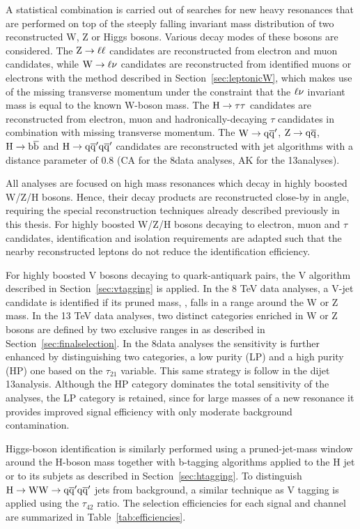 A statistical combination is carried out of searches for new heavy resonances that are performed on top of the steeply falling invariant mass distribution of two reconstructed W, Z or Higgs bosons. Various decay modes of these bosons are considered.
The $\mathrm{Z}\to\ell\ell$ candidates are reconstructed from electron and muon candidates, while $\mathrm{W}\to\ell\nu$ candidates are reconstructed from identified muons or electrons with the method described in Section~\ref{sec:leptonicW}, which makes use of the missing transverse momentum under the constraint that the $\ell\nu$ invariant mass is equal to the known W-boson mass.
The $\mathrm{H}\to\tau\tau$ candidates are reconstructed from electron, muon and hadronically-decaying $\tau$ candidates in combination with missing transverse momentum.
The $\mathrm{W}\to\mathrm{q}\overline{\mathrm{q}}'$, $\mathrm{Z}\to\mathrm{q}\overline{\mathrm{q}}$, $\mathrm{H}\to{\mathrm{b}\overline{\mathrm{b}}}$ and $\mathrm{H}\to\mathrm{q}\overline{\mathrm{q}}'\mathrm{q}\overline{\mathrm{q}}'$ candidates are reconstructed with jet algorithms with a distance parameter of 0.8 (CA for the 8\TeV data analyses, AK for the 13\TeV analyses). 

All analyses are focused on high mass resonances which decay in highly boosted W/Z/H bosons. Hence, their decay products are reconstructed close-by in angle, requiring the special reconstruction techniques already described previously in this thesis. For highly boosted W/Z/H bosons decaying to electron, muon and $\tau$ candidates, identification and isolation requirements are adapted such that the nearby reconstructed leptons do not reduce the identification efficiency.

For highly boosted V bosons decaying to quark-antiquark pairs, the V algorithm described in Section~\ref{sec:vtagging} is applied.
In the 8 TeV data analyses, a V-jet candidate is identified if its pruned mass, \mJ, falls in a range around the W or Z mass.
In the 13 TeV data analyses, two distinct categories enriched in W or Z bosons are defined by two exclusive ranges in \mJ as described in Section~\ref{sec:finalselection}.
In the 8\TeV data analyses the sensitivity is further enhanced by distinguishing two categories, a low purity (LP) and a high purity (HP) one based on the $\tau_{21}$ variable.
This same strategy is follow in the dijet 13\TeV analysis. Although the HP category dominates the total sensitivity of the analyses, the LP category is retained,
since for large masses of a new resonance it provides improved signal efficiency with only moderate background contamination.

Higgs-boson identification is similarly performed using a pruned-jet-mass window around the H-boson mass together with b-tagging algorithms applied to the H jet or to its subjets as described in Section~\ref{sec:htagging}.
To distinguish $\mathrm{H}\to\mathrm{W}\mathrm{W}\to\mathrm{q}\overline{\mathrm{q}}'\mathrm{q}\overline{\mathrm{q}}'$ jets from background, a similar technique as V tagging is applied using the $\tau_{42}$ ratio. The selection efficiencies for each signal and channel are summarized in Table~\ref{tab:efficiencies}.

